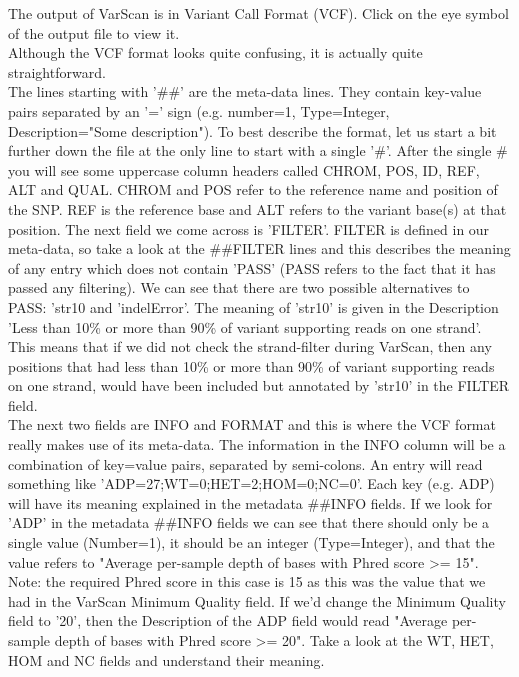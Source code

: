 \documentclass[12pt,a4paper]{article}
\begin{document}
The output of VarScan is in Variant Call Format (VCF). Click on the
eye symbol of the output file to view it. \\ Although the VCF format
looks quite confusing, it is actually quite straightforward. \\

The lines starting with '\#\#' are the meta-data lines. They contain
key-value pairs separated by an '=' sign (e.g. number=1, Type=Integer,
Description="Some description"). To best describe the format, let us
start a bit further down the file at the only line to start with a
single '\#'. After the single \# you will see some uppercase column
headers called CHROM, POS, ID, REF, ALT and QUAL.  CHROM and POS refer
to the reference name and position of the SNP. REF is the reference
base and ALT refers to the variant base(s) at that position. The next
field we come across is 'FILTER'. FILTER is defined in our meta-data,
so take a look at the \#\#FILTER lines and this describes the meaning
of any entry which does not contain 'PASS' (PASS refers to the fact
that it has passed any filtering). We can see that there are two
possible alternatives to PASS: 'str10 and 'indelError'. The meaning of
'str10' is given in the Description 'Less than 10\% or more than 90\%
of variant supporting reads on one strand'. This means that if we did
not check the strand-filter during VarScan, then any positions that
had less than 10\% or more than 90\% of variant supporting reads on
one strand, would have been included but annotated by 'str10' in the
FILTER field.  \\ 

The next two fields are INFO and FORMAT and this is where the VCF
format really makes use of its meta-data. The information in the INFO
column will be a combination of key=value pairs, separated by
semi-colons. An entry will read something like
'ADP=27;WT=0;HET=2;HOM=0;NC=0'. Each key (e.g. ADP) will have its
meaning explained in the metadata \#\#INFO fields. If we look for
'ADP' in the metadata \#\#INFO fields we can see that there should
only be a single value (Number=1), it should be an integer
(Type=Integer), and that the value refers to "Average per-sample depth
of bases with Phred score >= 15". Note: the required Phred score in
this case is 15 as this was the value that we had in the VarScan
Minimum Quality field. If we'd change the Minimum Quality field to
'20', then the Description of the ADP field would read "Average
per-sample depth of bases with Phred score >= 20". Take a look at the
WT, HET, HOM and NC fields and understand their meaning.
\end{document}
